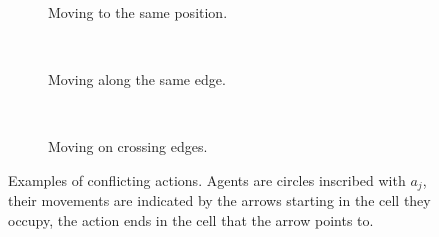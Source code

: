 \begin{figure}[b]
	\centering
	\begin{subfigure}[b]{.3\textwidth}
		\centering
	    \def\svgscale{.7}
		
		\caption{Moving to the same position.}
		\label{fig:conflict-position}
	\end{subfigure}
	~
	\begin{subfigure}[b]{.3\textwidth}
		\centering
	    \def\svgscale{.7}
		
		\caption{Moving along the same edge.}
		\label{fig:conflict-same}
	\end{subfigure}
	~
	\begin{subfigure}[b]{.3\textwidth}
		\centering
  \def\svgscale{.7}
		
		\caption{Moving on crossing edges.}
		\label{fig:conflict-crossing}
	\end{subfigure}
	\caption{Examples of conflicting actions. Agents are circles inscribed with
	$a_j$, their movements are indicated by the arrows starting in the cell
	they occupy, the action ends in the cell that the arrow points to.}
	\label{fig:conflicts}
\end{figure}